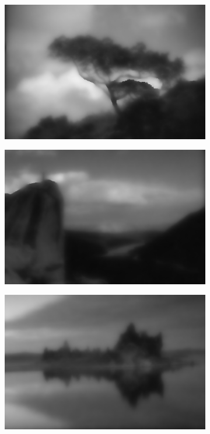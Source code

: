 \documentclass[onecolumn,final,a4paper,13pt,reqno]{siamart}
\begin{document}
\begin{figure}[h]
\begin{subfigure}[t]{0.19\textwidth}
	\end{subfigure}
	\begin{subfigure}[t]{0.19\textwidth}
		\includegraphics[scale=0.175]{pictures/denoising/image/147091_ipiano_squared.png}
	\end{subfigure}
	\begin{subfigure}[t]{0.19\textwidth}
		\includegraphics[scale=0.175]{pictures/denoising/image/14037_ipiano_squared.png}
	\end{subfigure}
	\begin{subfigure}[t]{0.19\textwidth}
		\includegraphics[scale=0.175]{pictures/denoising/image/143090_ipiano_squared.png}

\end{subfigure}
\end{figure}
\end{document}
